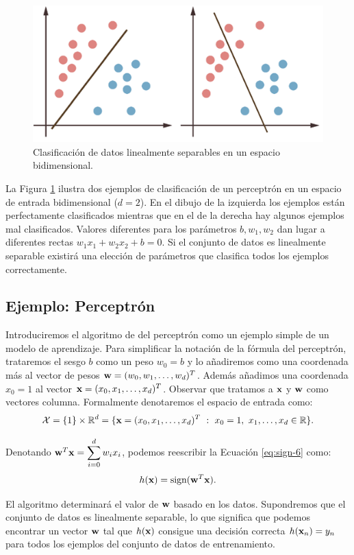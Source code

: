 \documentclass[oneside,openright,titlepage,numbers=noenddot,openany,headinclude,footinclude=true,
cleardoublepage=empty,abstractoff,BCOR=5mm,paper=a4,fontsize=12pt,main=spanish]{scrreprt}
\begin{document}
\begin{figure}[h]
	\centering
	\includegraphics[width=12.4cm]{gbclassified.png}
	\caption{Clasificación de datos linealmente separables en un espacio bidimensional.}
    \label{fig:linsep}
\end{figure}

La Figura \ref{fig:linsep} ilustra dos ejemplos de clasificación de un perceptrón en un espacio de entrada bidimensional ($d=2$). En el dibujo de la izquierda los ejemplos están perfectamente clasificados mientras que en el de la derecha hay algunos ejemplos mal clasificados. Valores diferentes para los parámetros $b,w_1,w_2$ dan lugar a diferentes rectas $w_1x_1+w_2x_2+b=0$. Si el conjunto de datos es linealmente separable existirá una elección de parámetros que clasifica todos los ejemplos correctamente.

\subsection{Ejemplo: Perceptrón} \label{subsec:perceptron}

Introduciremos el algoritmo de del perceptrón como un ejemplo simple de un modelo de aprendizaje. Para simplificar la notación de la fórmula del perceptrón, trataremos el sesgo $b$ como un peso $w_0=b$ y lo añadiremos como una coordenada más al vector de pesos $\textbf{w}=(w_0,w_1,\dots,w_d)^T$. Además añadimos una coordenada $x_0=1$ al vector $\textbf{x}=(x_0,x_1,\dots,x_d)^T$. Observar que tratamos a $\textbf{x}$ y $\textbf{w}$ como vectores columna. Formalmente denotaremos el espacio de entrada como: $$\mathcal{X}=\{1\}\times \mathbb{R}^d=\{\textbf{x}=(x_0,x_1,\dots,x_d)^T \ : \ x_0=1, \ x_1,\dots,x_d \in \mathbb{R}\}.$$

Denotando $\textbf{w}^T\textbf{x}=\displaystyle \sum_{i=0}^d w_ix_i$, podemos reescribir la Ecuación \ref{eq:sign-6} como: $$h(\textbf{x})=\text{sign}(\textbf{w}^T\textbf{x}).$$

El algoritmo determinará el valor de $\textbf{w}$ basado en los datos. Supondremos que el conjunto de datos es linealmente separable, lo que significa que podemos encontrar un vector $\textbf{w}$ tal que $h(\textbf{x})$ consigue una decisión correcta $h(\textbf{x}_n)=y_n$ para todos los ejemplos del conjunto de datos de entrenamiento.\\
\end{document}
